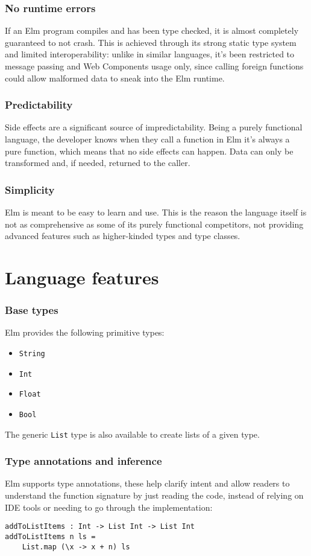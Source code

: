 \subsubsection{No runtime errors}
If an Elm program compiles and has been type checked, it is almost completely guaranteed to not crash. This is achieved through its strong static type system and limited interoperability: unlike in similar languages, it's been restricted to message passing and Web Components usage only, since calling foreign functions could allow malformed data to sneak into the Elm runtime.

\subsubsection{Predictability}
Side effects are a significant source of impredictability. Being a purely functional language, the developer knows when they call a function in Elm it's always a pure function, which means that no side effects can happen. Data can only be transformed and, if needed, returned to the caller.

\subsubsection{Simplicity}
Elm is meant to be easy to learn and use. This is the reason the language itself is not as comprehensive as some of its purely functional competitors, not providing advanced features such as higher-kinded types and type classes.

\section{Language features}
\subsubsection{Base types}
Elm provides the following primitive types:
\begin{itemize}
    \item \texttt{String}
    \item \texttt{Int}
    \item \texttt{Float}
    \item \texttt{Bool}
\end{itemize}
The generic \texttt{List} type is also available to create lists of a given type.\\

\subsubsection{Type annotations and inference}
Elm supports type annotations, these help clarify intent and allow readers to understand the function signature by just reading the code, instead of relying on IDE tools or needing to go through the implementation:
\begin{verbatim}
addToListItems : Int -> List Int -> List Int
addToListItems n ls =
    List.map (\x -> x + n) ls
\end{verbatim}

